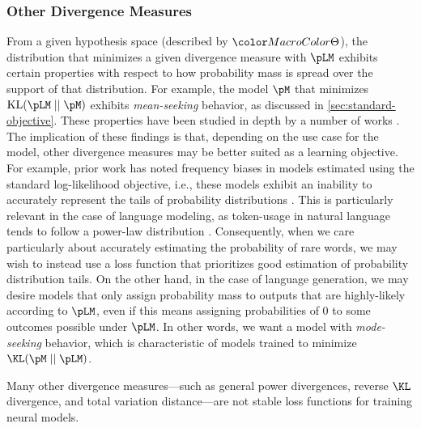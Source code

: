 \subsubsection{Other Divergence Measures}
From a given hypothesis space (described by $\paramspace$), the distribution  that  minimizes a given divergence measure with $\pLM$ exhibits certain properties with respect to how probability mass is spread over the support of that distribution. For example, the model $\pM$ that minimizes $\mathrm{KL}(\pLM \mid\mid \pM)$ exhibits \emph{mean-seeking} behavior, as discussed in \cref{sec:standard-objective}. These properties  have been studied in depth by a number of works \citep{minka_divergence,theis_note_2016,huszar_how_2015,labeau-cohen-2019-experimenting}. 
The implication of these findings is that, depending on the use case for the model, other divergence measures may be better suited as a learning objective. For example, prior work has noted frequency biases in models estimated using the standard log-likelihood objective, i.e., these models exhibit an inability to accurately represent the tails of probability distributions \citep{gong_frequency,wei-etal-2021-frequency}. This is particularly relevant in the case of language modeling, as token-usage in natural language tends to follow a power-law distribution \citep{zipf}. 
Consequently, when we care particularly about accurately estimating the probability of rare words, we may wish to instead use a loss function that prioritizes good estimation of probability distribution tails.  On the other hand, in the case of language generation, we may desire models that only assign probability mass to outputs that are highly-likely according to $\pLM$, even if this means assigning probabilities of $0$ to some outcomes possible under $\pLM$. In other words, we want a model with \emph{mode-seeking} behavior, which is characteristic of models trained to minimize $\KL(\pM \mid\mid \pLM)$.

Many other divergence measures---such as general power divergences, reverse $\KL$ divergence, and total variation distance---are not stable loss functions for training neural models. 




